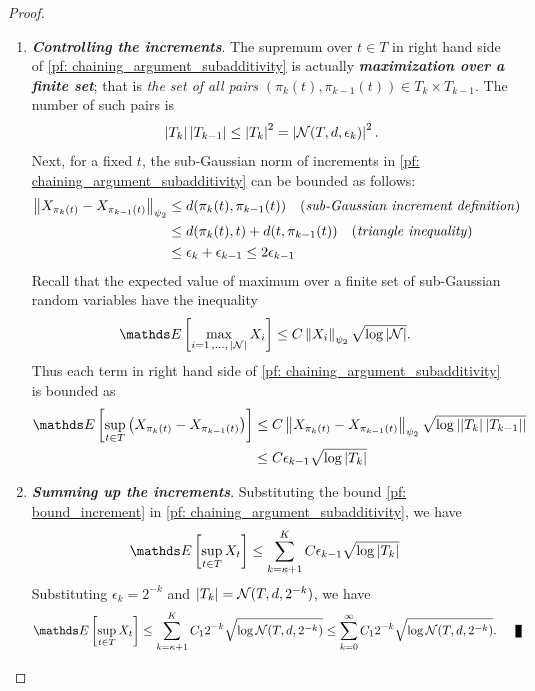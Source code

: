 \documentclass[11pt]{article}
\begin{document}
\begin{itemize}
\begin{proof}
\begin{enumerate}
\item \textbf{\emph{Controlling the increments}}. The supremum over $t\in T$ in right hand side of \eqref{pf: chaining_argument_subadditivity} is actually \textbf{\emph{maximization over a finite set}}; that is \emph{the set of all pairs} $(\pi_k(t), \pi_{k-1}(t)) \in T_{k} \times T_{k-1}$. The number of such pairs is
\begin{align*}
\left\lvert T_k \right\rvert \left\lvert T_{k-1} \right\rvert \le \left\lvert T_k \right\rvert^2 = \left\lvert  {\mathcal N}(T, d, \epsilon_k) \right\rvert^2.
\end{align*} Next, for a fixed $t$, the sub-Gaussian norm of increments in \eqref{pf: chaining_argument_subadditivity}  can be bounded as follows:
\begin{align*}
 \left\|X_{\pi_k(t)} - X_{\pi_{k-1}(t)}\right\|_{\psi_2} &\le d(\pi_k(t), \pi_{k-1}(t)) \quad (\text{\emph{sub-Gaussian increment definition}})\\
&\le d(\pi_k(t), t) + d(t, \pi_{k-1}(t)) \quad (\text{\emph{triangle inequality}})\\
&\le \epsilon_k + \epsilon_{k-1} \le 2\epsilon_{k-1}
\end{align*} Recall that the expected value of maximum over a finite set of sub-Gaussian random variables have the inequality 
\begin{align*}
\E{}{\max\limits_{i=1 \xdotx{,} \abs{\cN}} X_i} &\le C \norm{X_i}{\psi_2}\sqrt{\log \abs{\cN}}.
\end{align*} Thus each term in right hand side of \eqref{pf: chaining_argument_subadditivity} is bounded as
\begin{align}
\E{}{\sup_{t\in T}\paren{X_{\pi_k(t)} - X_{\pi_{k-1}(t)}}} &\le C  \norm{X_{\pi_k(t)} - X_{\pi_{k-1}(t)}}{\psi_2}\sqrt{\log \abs{\abs{T_k} \abs{T_{k-1}}}} \nonumber\\
&\le C \epsilon_{k-1} \sqrt{\log \abs{T_k }} \label{pf: bound_increment}
\end{align}

\item \textbf{\emph{Summing up the increments}}. Substituting the bound \eqref{pf: bound_increment} in \eqref{pf: chaining_argument_subadditivity}, we have
\begin{align}
\E{}{\sup_{t\in T}X_t} &\le \sum_{k=\kappa+1}^{K}C \epsilon_{k-1} \sqrt{\log \abs{T_k }} \label{pf: bound_increment_2}
\end{align} Substituting $\epsilon_k = 2^{-k}$ and $\left\lvert T_k \right\rvert = {\mathcal N}(T, d, 2^{-k}) $, we have
\begin{align*}
\E{}{\sup_{t\in T}X_t} &\le \sum_{k=\kappa+1}^{K}C_1 2^{-k} \sqrt{\log \cN(T, d, 2^{-k}) } \le  \sum_{k=0}^{\infty}C_1 2^{-k} \sqrt{\log \cN(T, d, 2^{-k}) }. \qed
\end{align*}
\end{enumerate}
\end{proof}


\end{itemize}
\end{document}
